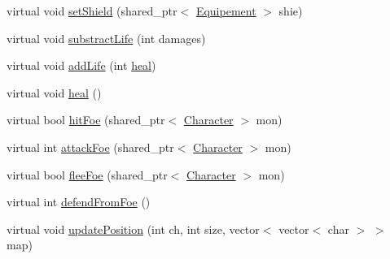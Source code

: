 \begin{DoxyCompactItemize}
\item 
virtual void \hyperlink{classCharacter_a2f919221ce089f34778e42c10a826ba8}{set\-Shield} (shared\-\_\-ptr$<$ \hyperlink{classEquipement}{Equipement} $>$ shie)
\item 
virtual void \hyperlink{classCharacter_acb060fb233be80ddaea98235d1359478}{substract\-Life} (int damages)
\item 
virtual void \hyperlink{classCharacter_ae918c7b3a969a663ac236d8be2dd2cbe}{add\-Life} (int \hyperlink{classCharacter_a3871907535bb9cf3a042822e2dd1ec5c}{heal})
\item 
virtual void \hyperlink{classCharacter_a3871907535bb9cf3a042822e2dd1ec5c}{heal} ()
\item 
virtual bool \hyperlink{classCharacter_a684f4e8ca9d0d3584b68a1b0f58ba6df}{hit\-Foe} (shared\-\_\-ptr$<$ \hyperlink{classCharacter}{Character} $>$ mon)
\item 
virtual int \hyperlink{classCharacter_a806a54c9d1cd1493187731805e7f0498}{attack\-Foe} (shared\-\_\-ptr$<$ \hyperlink{classCharacter}{Character} $>$ mon)
\item 
virtual bool \hyperlink{classCharacter_a153234821b45278ac2881b8bb232f526}{flee\-Foe} (shared\-\_\-ptr$<$ \hyperlink{classCharacter}{Character} $>$ mon)
\item 
virtual int \hyperlink{classCharacter_a3ab7441a4186ff819f5abd5d3c362d33}{defend\-From\-Foe} ()
\item 
virtual void \hyperlink{classCharacter_a6e56b870b7f9d4ea845cf644cf458cb4}{update\-Position} (int ch, int size, vector$<$ vector$<$ char $>$ $>$ map)
\end{DoxyCompactItemize}

